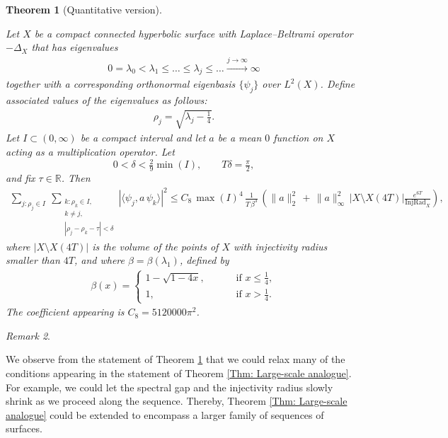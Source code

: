 \documentclass[11pt,twoside,reqno]{amsart} \usepackage{a4wide} \usepackage[T1]{fontenc} \usepackage[utf8]{inputenc} \usepackage{soul}  \usepackage{amsmath} \usepackage{amsfonts} \usepackage{amssymb} \usepackage{mathtools} \usepackage{amsthm} \usepackage{xcolor} \usepackage{graphicx} \usepackage{hyperref} \usepackage{standalone} \usepackage{esint} \usepackage{comment} \usepackage[left=2.3cm,top=3cm,right=2.3cm]{geometry} \usepackage{bm} \usepackage{svg} \usepackage{float} \numberwithin{equation}{section} \theoremstyle{plain} \newtheorem{thm}{Theorem}[section] \newtheorem{theorem}[thm]{Theorem} \newtheorem*{theorem*}{Theorem}\newtheorem{conj}[thm]{Conjecture} \newtheorem{lemma}[thm]{Lemma} \newtheorem{prop}[thm]{Proposition} \newtheorem{proposition}[thm]{Proposition} \newtheorem{cor}[thm]{Corollary} \newtheorem{question}[thm]{Question} \newtheorem{corollary}[thm]{Corollary} \newtheorem{assumption}[thm]{Assumption} \theoremstyle{definition} \newtheorem{defn}[thm]{Definition} \newtheorem{choice}[thm]{Choice} \newtheorem{definition}[thm]{Definition} \newtheorem{ex}[thm]{Example} \newtheorem{notation}[thm]{Notation} \newtheorem*{ack}{Acknowledgements} \theoremstyle{remark} \newtheorem{remark}[thm]{Remark} \newtheorem{bigremark}[thm]{Remark} \usepackage{xcolor} \newcommand{\red}[1]{ {\color{Red}#1} } \newcommand{\blue}[1]{ {\color{Blue}#1} } \author{Kai Hippi} \address{Aalto University, Espoo, Finland} \email{kai.hippi@aalto.fi}
\begin{document}
\begin{theorem}[Quantitative version]
\label{Thm: Quantitative main theorem}

Let $ X $ be a compact connected hyperbolic surface with Laplace--Beltrami operator $ -\Delta_{X} $ that has eigenvalues
\begin{align*}
	0 = \lambda_{0} < \lambda_{1} \leq \dots \leq \lambda_{j} \leq \dots \xrightarrow{j \to \infty} \infty
\end{align*}
together with a corresponding orthonormal eigenbasis $ \{ \psi_{j} \} $ over $ L^{2}( X ) $. Define associated values of the eigenvalues as follows: 
\begin{align*}
	\rho_{j} = \sqrt{ \lambda_{j} - \tfrac{1}{4} }.
\end{align*}
Let $I \subset (0,\infty)$ be a compact interval and let $a$ be a mean $0$ function on $ X $ acting as a multiplication operator. Let 
\[
0 < \delta < \tfrac{2}{9} \min(I),
\qquad
T\delta = \tfrac{\pi}{2},
\]
and fix $\tau \in \mathbb{R}$. Then
\begin{align*}
\sum_{j:\rho_j \in I}
\ \sum_{\substack{ k: \rho_{k} \in I, \\ k \neq j, \\ |\rho_j - \rho_k - \tau| < \delta}}
\left| \langle \psi_j, a \, \psi_k \rangle \right|^2
\leq C_{8} \, \max( I )^{4} \, \frac{1}{T \, \beta^{3}} \, \left( \| a \|_{2}^{2} \, + \,  \| a \|_{\infty}^{2} \, | X \setminus X( 4T ) | \frac{e^{6 T}}{ \operatorname{InjRad}_{X} } \right),
\end{align*}
where $ | X \setminus X( 4T ) | $ is the volume of the points of $ X $ with injectivity radius smaller than $ 4T $, and where $\beta = \beta( \lambda_{1} )$, defined by
\begin{align*}
	\beta( x ) = 
	\begin{cases}	
		1 - \sqrt{1 - 4x}, \qquad &\text{ if } x \leq \frac{1}{4},
		\\
		1, \qquad &\text{ if } x > \frac{1}{4}.
	\end{cases}
\end{align*}
The coefficient appearing is $C_{8} = 5120000 \pi^{2}$.

\end{theorem}

\begin{remark}
\label{Rmk: Quantitative main theorem}

We observe from the statement of Theorem \ref{Thm: Quantitative main theorem} that we could relax many of the conditions appearing in the statement of Theorem \ref{Thm: Large-scale analogue}. For example, we could let the spectral gap and the injectivity radius slowly shrink as we proceed along the sequence. Thereby, Theorem \ref{Thm: Large-scale analogue} could be extended to encompass a larger family of sequences of surfaces.

\end{remark}
\end{document}
